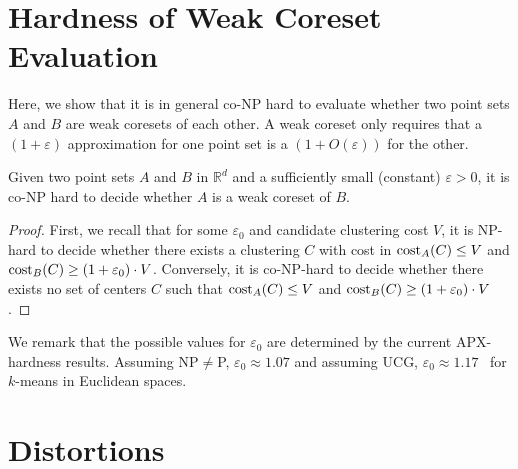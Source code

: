 \section{Hardness of Weak Coreset Evaluation}

Here, we show that it is in general co-NP hard to evaluate whether two point sets $A$ and $B$ are weak coresets of each other. A weak coreset only requires that a $(1+\varepsilon)$ approximation for one point set is a $(1+O(\varepsilon))$ for the other.


\begin{proposition}
\label{prop:hardness}
Given two point sets $A$ and $B$ in $\mathbb{R}^d$ and a sufficiently small (constant) $\varepsilon>0$, it is co-NP hard to decide whether $A$ is a weak coreset of $B$.
\end{proposition}
\begin{proof}
First, we recall that for some $\varepsilon_0$ and candidate clustering cost $V$, it is NP-hard to decide whether there exists a clustering $C$ with cost in $\text{cost}_A(C)\leq V$ and $\text{cost}_B(C)\geq (1+\varepsilon_0)\cdot V$.
Conversely, it is co-NP-hard to decide whether there exists no set of centers $C$ such that $\text{cost}_A(C)\leq V$ and $\text{cost}_B(C) \geq (1+\varepsilon_0)\cdot V$.
\end{proof}

We remark that the possible values for $\varepsilon_0$ are determined by the current APX-hardness results. Assuming NP$\neq$P, $\varepsilon_0\approx 1.07$ and assuming UCG, $\varepsilon_0 \approx 1.17$~\cite{Cohen-AddadSL21,Cohen-AddadS19} for $k$-means in Euclidean spaces.




\section{Distortions}

